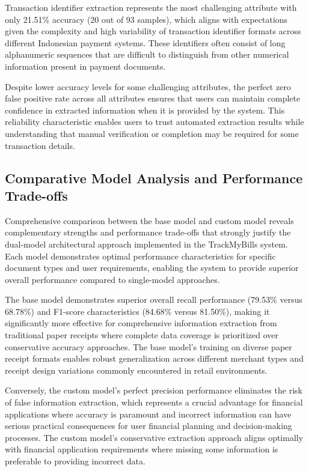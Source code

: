 Transaction identifier extraction represents the most challenging attribute with only 21.51\% accuracy (20 out of 93 samples), which aligns with expectations given the complexity and high variability of transaction identifier formats across different Indonesian payment systems. These identifiers often consist of long alphanumeric sequences that are difficult to distinguish from other numerical information present in payment documents.

Despite lower accuracy levels for some challenging attributes, the perfect zero false positive rate across all attributes ensures that users can maintain complete confidence in extracted information when it is provided by the system. This reliability characteristic enables users to trust automated extraction results while understanding that manual verification or completion may be required for some transaction details.

\subsection{Comparative Model Analysis and Performance Trade-offs}
Comprehensive comparison between the base model and custom model reveals complementary strengths and performance trade-offs that strongly justify the dual-model architectural approach implemented in the TrackMyBills system. Each model demonstrates optimal performance characteristics for specific document types and user requirements, enabling the system to provide superior overall performance compared to single-model approaches.

The base model demonstrates superior overall recall performance (79.53\% versus 68.78\%) and F1-score characteristics (84.68\% versus 81.50\%), making it significantly more effective for comprehensive information extraction from traditional paper receipts where complete data coverage is prioritized over conservative accuracy approaches. The base model's training on diverse paper receipt formats enables robust generalization across different merchant types and receipt design variations commonly encountered in retail environments.

Conversely, the custom model's perfect precision performance eliminates the risk of false information extraction, which represents a crucial advantage for financial applications where accuracy is paramount and incorrect information can have serious practical consequences for user financial planning and decision-making processes. The custom model's conservative extraction approach aligns optimally with financial application requirements where missing some information is preferable to providing incorrect data.

